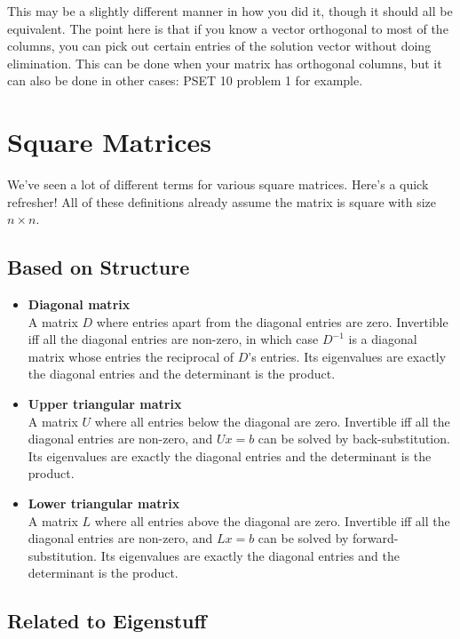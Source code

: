 \documentclass[11pt]{article}
\theoremstyle{plain} %
\theoremstyle{definition}
\theoremstyle{remark}
\begin{document}
This may be a slightly different manner in how you did it, though it should all be equivalent. The point here is that if you know a vector orthogonal to most of the columns, you can pick out certain entries of the solution vector without doing elimination. This can be done when your matrix has orthogonal columns, but it can also be done in other cases: PSET 10 problem 1 for example.
\clearpage

\section{Square Matrices}
We've seen a lot of different terms for various square matrices. Here's a quick refresher! All of these definitions already assume the matrix is square with size $n \times n$.

\subsection{Based on Structure}
\begin{itemize}
\item \textbf{Diagonal matrix}\\
A matrix $D$ where entries apart from the diagonal entries are zero. Invertible iff all the diagonal entries are non-zero, in which case $D^{-1}$ is a diagonal matrix whose entries the reciprocal of $D$'s entries. Its eigenvalues are exactly the diagonal entries and the determinant is the product.
\item \textbf{Upper triangular matrix}\\
A matrix $U$ where all entries below the diagonal are zero. Invertible iff all the diagonal entries are non-zero, and $Ux = b$ can be solved by back-substitution. Its eigenvalues are exactly the diagonal entries and the determinant is the product.
\item \textbf{Lower triangular matrix}\\
A matrix $L$ where all entries above the diagonal are zero. Invertible iff all the diagonal entries are non-zero, and $Lx = b$ can be solved by forward-substitution. Its eigenvalues are exactly the diagonal entries and the determinant is the product.
\end{itemize}

\subsection{Related to Eigenstuff}
\end{document}

